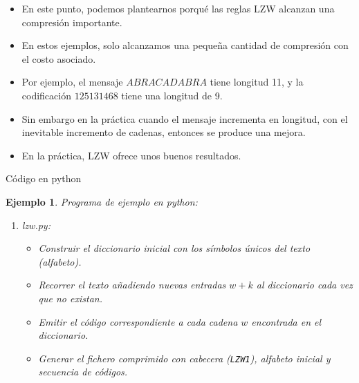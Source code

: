 \documentclass{beamer}
\theoremstyle{plain}
\theoremstyle{example}
\theoremstyle{example}
\newtheorem{ejemplo} [Ejemplo] {Ejemplo}
\begin{document}
\begin{frame}  \small 

\begin{itemize}
\item En este punto, podemos plantearnos porqué las reglas LZW alcanzan una compresión importante.  

\item En estos ejemplos, solo alcanzamos una pequeña cantidad de compresión con el costo asociado.

\item Por ejemplo, el mensaje $ABRACADABRA$ tiene longitud 11, y la codificación $1 2 5 1 3 1 4 6 8$ tiene una longitud de 9. 

\item Sin embargo en la práctica cuando el mensaje incrementa en longitud, con el inevitable incremento de cadenas, entonces se produce una mejora.

\item En la práctica, LZW ofrece unos buenos resultados.

\end{itemize}
 

\end{frame} 

\begin{frame}{Código en python}  \footnotesize

\begin{ejemplo}

Programa de ejemplo en python:

\begin{enumerate}\footnotesize
    \item lzw.py: \footnotesize
        \begin{itemize}\footnotesize
            \item Construir el \alert{diccionario inicial} con los símbolos únicos del texto (alfabeto).
            \item Recorrer el texto añadiendo nuevas entradas \(w+k\) al diccionario cada vez que no existan.
            \item Emitir el código correspondiente a cada cadena \(w\) encontrada en el diccionario.
            \item Generar el fichero comprimido con cabecera (\texttt{LZW1}), alfabeto inicial y secuencia de códigos.
        \end{itemize}
\end{enumerate}

\end{ejemplo}


\end{frame} 
\end{document}

